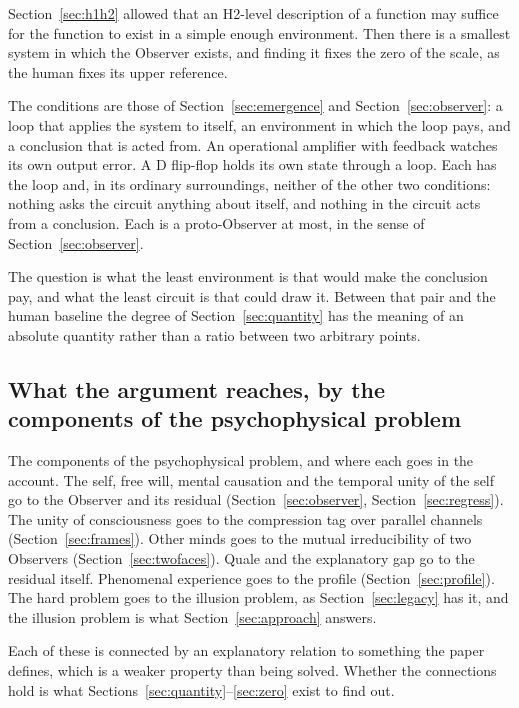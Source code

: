 Section~\ref{sec:h1h2} allowed that an H2-level description of a function may suffice for the function to
exist in a simple enough environment. Then there is a smallest system in which the Observer exists, and
finding it fixes the zero of the scale, as the human fixes its upper reference.

The conditions are those of Section~\ref{sec:emergence} and Section~\ref{sec:observer}: a loop that
applies the system to itself, an environment in which the loop pays, and a conclusion that is acted from.
An operational amplifier with feedback watches its own output error. A D flip-flop holds its own state
through a loop. Each has the loop and, in its ordinary surroundings, neither of the other two conditions:
nothing asks the circuit anything about itself, and nothing in the circuit acts from a conclusion. Each
is a proto-Observer at most, in the sense of Section~\ref{sec:observer}.

The question is what the least environment is that would make the conclusion pay, and what the least
circuit is that could draw it. Between that pair and the human baseline the degree of
Section~\ref{sec:quantity} has the meaning of an absolute quantity rather than a ratio between two
arbitrary points.

\subsection{What the argument reaches, by the components of the psychophysical problem}

The components of the psychophysical problem, and where each goes in the account. The self, free will,
mental causation and the temporal unity of the self go to the Observer and its residual
(Section~\ref{sec:observer}, Section~\ref{sec:regress}). The unity of consciousness goes to the
compression tag over parallel channels (Section~\ref{sec:frames}). Other minds goes to the mutual
irreducibility of two Observers (Section~\ref{sec:twofaces}). Quale and the explanatory gap go to the
residual itself. Phenomenal experience goes to the profile (Section~\ref{sec:profile}). The hard problem
goes to the illusion problem, as Section~\ref{sec:legacy} has it, and the illusion problem is what
Section~\ref{sec:approach} answers.

Each of these is connected by an explanatory relation to something the paper defines, which is a
weaker property than being solved. Whether the connections hold is what
Sections~\ref{sec:quantity}--\ref{sec:zero} exist to find out.

